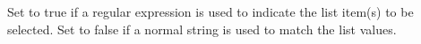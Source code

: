     Set to true if a regular expression is used to
  indicate the list item(s) to be selected. Set to false
  if a normal string is used to match the list values.
